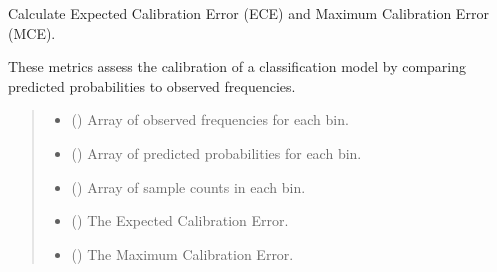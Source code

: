\documentclass[letterpaper,10pt,english]{sphinxmanual}
\begin{document}
\begin{fulllineitems}
\label{\detokenize{calzone:calzone.metrics.calculate_ece_mce}}
\pysigstartsignatures
{}
\pysigstopsignatures
\sphinxAtStartPar
Calculate Expected Calibration Error (ECE) and Maximum Calibration Error (MCE).

\sphinxAtStartPar
These metrics assess the calibration of a classification model by comparing
predicted probabilities to observed frequencies.
\begin{quote}\begin{description}
\begin{itemize}
\item {} 
\sphinxAtStartPar
{} () \textendash{} Array of observed frequencies for each bin.

\item {} 
\sphinxAtStartPar
{} () \textendash{} Array of predicted probabilities for each bin.

\item {} 
\sphinxAtStartPar
{} () \textendash{} Array of sample counts in each bin.

\end{itemize}

\begin{itemize}
\item {} 
\sphinxAtStartPar
{} () \textendash{} The Expected Calibration Error.

\item {} 
\sphinxAtStartPar
{} () \textendash{} The Maximum Calibration Error.

\end{itemize}

\end{description}\end{quote}


\end{fulllineitems}
\end{document}
